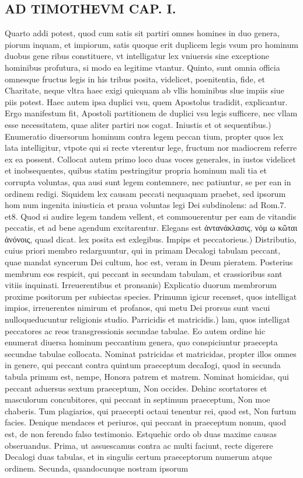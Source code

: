 \documentclass{article}
\begin{document}
\begin{pages}
\section*{AD TIMOTHEVM CAP. I. }
\marginpar{[ p.28 ]}\pstart Quarto addi potest, quod cum satis sit partiri omnes homines in duo genera, piorum inquam, et impiorum, satis quoque  erit duplicem legis vsum pro hominum duobus gene ribus constituere, vt intelligatur lex vniuersis sine exceptione hominibus profutura, si modo ea legitime vtantur. Quinto, sunt omnia officia omnesque  fructus legis in his tribus posita, videlicet, poenitentia, fide, et Charitate, neque  vltra haec exigi quicquam ab vllis hominibus slue impiis siue piis potest. Haec autem ipsa duplici vsu, quem Apostolus tradidit, explicantur. Ergo manifestum fit, Apostoli partitionem de duplici vsu legis sufficere, nec vllam esse necessitatem, quae aliter partiri nos cogat.  \pend\pstart Iniustis et ot sequentibus.) Enumeratio diuersorum hominum contra legem peccan tium, propter quos lex lata intelligitur, vtpote qui si recte vterentur lege, fructum nor madiocrem referre ex ea possent. Collocat autem primo loco duas voces generales, in iustos videlicet et inobsequentes, quibus statim pestringitur propria hominum mali tia et corrupta voluntas, qua ausi sunt legem contemnere, nec patiuntur, se per ean in ordinem redigi. Siquidem lex causam peccati nequaquam praebet, sed ipsorum hom num ingenita iniusticia et praua voluntas legi Dei subdinolens: ad Rom.7. et8. Quod si audire legem tandem vellent, et commouerentur per eam de vitandis peccatis, et ad bene agendum excitarentur. Elegans est ἀντανάκλασις, νόμ ω κῶται ἀνόνοις, quasl dicat. lex posita est exlegibus.  \pend\pstart Impips et peccatorieus.) Distributio, cuius priori membro redarguuntur, qui in primam Decalogi tabulam peccant, quae mandat syncerum Dei cultum, hoc est, veram in Deum pieratem. Posterius membrum eos respicit, qui peccant in secundam tabulam, et crassioribus sant vitiis inquinati.  \pend\pstart Irreuerentibus et pronsanis) Explicatio duorum membrorum proxime positorum per subiectas species. Primumn igicur recenset, quos intelligat impios, irreuerentes nimirum et profanos, qui metu Dei prorsus sunt vacui nulloqueducuntur religionis studio.  \pend\pstart Parricidis et matricidis.) lam, quos intelligat peccatores ac reos transgressionis secundae tabulae. Eo autem ordine hic enumerat diuersa hominum peccantium genera, quo conspiciuntur praecepta secundae tabulae collocata. Nominat patricidas et matricidas, propter illos omnes in genere, qui peccant contra quintum praeceptum decaIogi, quod in secunda tabula primum est, nempe, Honora patrem et matrem. Nominat homicidas, qui peccant aduersus sextum praeceptum, Non occides. Dehinc scortatores et masculorum concubitores, qui peccant in septimum praeceptum, Non moe chaberis. Tum plagiarios, qui praecepti octaui tenentur rei, quod est, Non furtum facies. Denique  mendaces et periuros, qui peccant in praeceptum nonum, quod est, de non ferendo falso testimonio. Estquehic ordo ob duas maxime causas obseruandus. Prima, ut assuescamus contra ac multi faciunt, recte digerere Decalogi duas tabulas, et in singulis certum praeceptorum numerum atque ordinem. Secunda, quandocunque  nostram ipsorum 
\end{pages}
\end{document}

